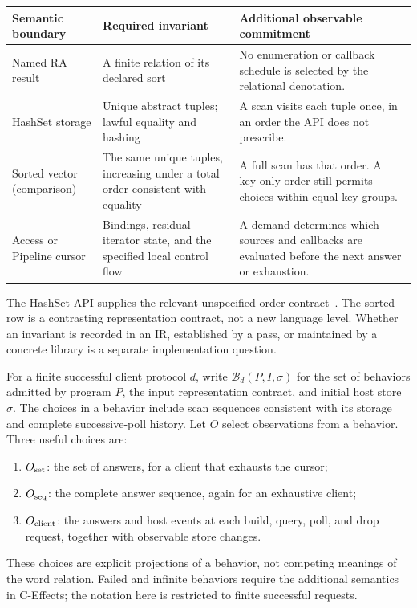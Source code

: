 \begin{center}\small
\begin{tabular}{>{\raggedright\arraybackslash}p{.19\linewidth}>{\raggedright\arraybackslash}p{.31\linewidth}>{\raggedright\arraybackslash}p{.42\linewidth}}
\toprule
Semantic boundary & Required invariant & Additional observable commitment \\
\midrule
Named RA result & A finite relation of its declared sort & No enumeration or
callback schedule is selected by the relational denotation. \\
HashSet storage & Unique abstract tuples; lawful equality and hashing & A scan
visits each tuple once, in an order the API does not prescribe. \\
Sorted vector (comparison) & The same unique tuples, increasing under a total
order consistent with equality & A full scan has that order. A key-only order
still permits choices within equal-key groups. \\
Access or Pipeline cursor & Bindings, residual iterator state, and the specified
local control flow & A demand determines which sources and callbacks are
evaluated before the next answer or exhaustion. \\
\bottomrule
\end{tabular}
\end{center}
The HashSet API supplies the relevant unspecified-order contract~\cite{hashset}.
The sorted row is a contrasting representation contract, not a new language
level. Whether an invariant is recorded in an IR, established by a pass, or
maintained by a concrete library is a separate implementation question.

For a finite successful client protocol $d$, write
$\mathcal B_d(P,I,\sigma)$ for the set of behaviors admitted by program $P$,
the input representation contract, and initial host store $\sigma$.
The choices in a behavior include scan sequences consistent with its storage
and complete successive-poll history. Let $O$ select observations from a
behavior. Three useful choices are:
\begin{enumerate}
\item $O_{\rm set}$: the set of answers, for a client that exhausts the cursor;
\item $O_{\rm seq}$: the complete answer sequence, again for an exhaustive client;
\item $O_{\rm client}$: the answers and host events at each build, query, poll,
and drop request, together with observable store changes.
\end{enumerate}
These choices are explicit projections of a behavior, not competing meanings
of the word relation. Failed and infinite behaviors require the additional
semantics in C-Effects; the notation here is restricted to finite successful
requests.

